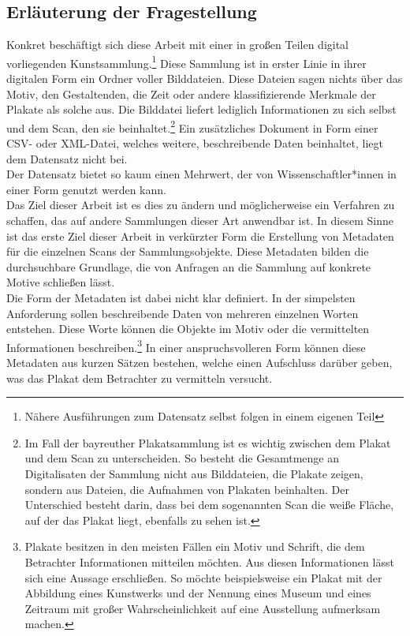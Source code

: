 \documentclass[a4paper,12pt,ngerman]{article}
\begin{document}
\subsection{Erläuterung der Fragestellung}
Konkret beschäftigt sich diese Arbeit mit einer in großen Teilen digital vorliegenden Kunstsammlung.\footnote{Nähere Ausführungen zum Datensatz selbst folgen in einem eigenen Teil}  Diese Sammlung ist in erster Linie in ihrer digitalen Form ein Ordner voller Bilddateien. Diese Dateien sagen nichts über das Motiv, den Gestaltenden, die Zeit oder andere klassifizierende Merkmale der Plakate als solche aus. Die Bilddatei liefert lediglich Informationen zu sich selbst und dem Scan, den sie beinhaltet.\footnote{Im Fall der bayreuther Plakatsammlung ist es wichtig zwischen dem Plakat und dem Scan zu unterscheiden. So besteht die Gesamtmenge an Digitalisaten der Sammlung nicht aus Bilddateien, die Plakate zeigen, sondern aus Dateien, die Aufnahmen von Plakaten beinhalten. Der Unterschied besteht darin, dass bei dem sogenannten Scan die weiße Fläche, auf der das Plakat liegt, ebenfalls zu sehen ist.} Ein zusätzliches Dokument in Form einer CSV- oder XML-Datei, welches weitere, beschreibende Daten beinhaltet, liegt dem Datensatz nicht bei. \\
Der Datensatz bietet so kaum einen Mehrwert, der von Wissenschaftler*innen in einer Form genutzt werden kann. \\
Das Ziel dieser Arbeit ist es dies zu ändern und möglicherweise ein Verfahren zu schaffen, das auf andere Sammlungen dieser Art anwendbar ist. In diesem Sinne ist das erste Ziel dieser Arbeit in verkürzter Form die Erstellung von Metadaten für die einzelnen Scans der Sammlungsobjekte. Diese Metadaten bilden die durchsuchbare Grundlage, die von Anfragen an die Sammlung auf konkrete Motive schließen lässt. \\
Die Form der Metadaten ist dabei nicht klar definiert. In der simpelsten Anforderung sollen beschreibende Daten von mehreren einzelnen Worten entstehen. Diese Worte können die Objekte im Motiv oder die vermittelten Informationen beschreiben.\footnote{Plakate besitzen in den meisten Fällen ein Motiv und Schrift, die dem Betrachter Informationen mitteilen möchten. Aus diesen Informationen lässt sich eine Aussage erschließen. So möchte beispielsweise ein Plakat mit der Abbildung eines Kunstwerks und der Nennung eines Museum und eines Zeitraum mit großer Wahrscheinlichkeit auf eine Ausstellung aufmerksam machen.}  In einer anspruchsvolleren Form können diese Metadaten aus kurzen Sätzen bestehen, welche einen Aufschluss darüber geben, was das Plakat dem Betrachter zu vermitteln versucht. \\
\end{document}
